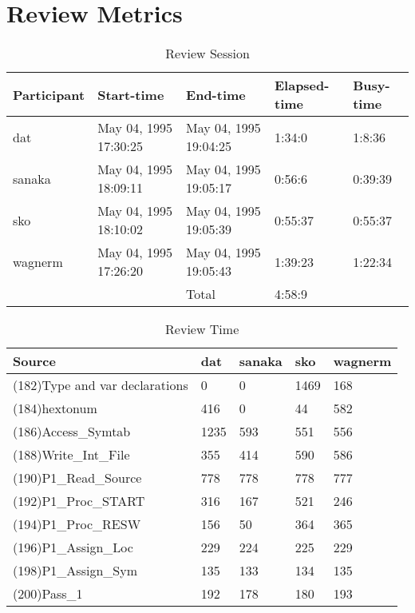 \section{Review Metrics}
\begin{table}[hb]
\begin{center}
\begin{tabular}{|l|l|l|l|l|}
\hline
Participant & Start-time & End-time & Elapsed-time & Busy-time \\
\hline
dat & May 04, 1995 17:30:25 & May 04, 1995 19:04:25 & 1:34:0 & 1:8:36 \\
sanaka & May 04, 1995 18:09:11 & May 04, 1995 19:05:17 & 0:56:6 & 0:39:39 \\
sko & May 04, 1995 18:10:02 & May 04, 1995 19:05:39 & 0:55:37 & 0:55:37 \\
wagnerm & May 04, 1995 17:26:20 & May 04, 1995 19:05:43 & 1:39:23 & 1:22:34 \\
\hline
 & & Total & 4:58:9 & \\
\hline
\end{tabular}
\end{center}
\caption{Review Session}
\end{table}


\begin{table}[hb]
\begin{center}
\begin{tabular}{|l|l|l|l|l|}
\hline
Source & dat & sanaka & sko & wagnerm\\
\hline
(182)Type and var declarations & 0 & 0 & 1469 & 168\\
(184)hextonum & 416 & 0 & 44 & 582\\
(186)Access\_Symtab & 1235 & 593 & 551 & 556\\
(188)Write\_Int\_File & 355 & 414 & 590 & 586\\
(190)P1\_Read\_Source & 778 & 778 & 778 & 777\\
(192)P1\_Proc\_START & 316 & 167 & 521 & 246\\
(194)P1\_Proc\_RESW & 156 & 50 & 364 & 365\\
(196)P1\_Assign\_Loc & 229 & 224 & 225 & 229\\
(198)P1\_Assign\_Sym & 135 & 133 & 134 & 135\\
(200)Pass\_1 & 192 & 178 & 180 & 193\\
\hline
\end{tabular}
\end{center}
\caption{Review Time}
\end{table}


